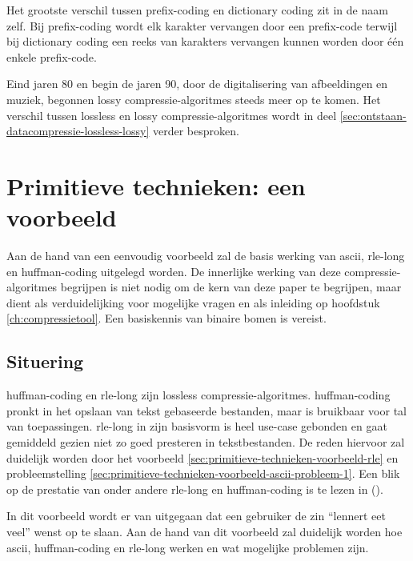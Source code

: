 Het grootste verschil tussen \gls{prefix-coding} en dictionary coding zit in de naam zelf. Bij \gls{prefix-coding} wordt elk karakter vervangen door een \gls{prefix-code} terwijl bij dictionary coding een reeks van karakters vervangen kunnen worden door één enkele \gls{prefix-code}.  

Eind jaren 80 en begin de jaren 90, door de digitalisering van afbeeldingen en muziek, begonnen \gls{lossy} \glspl{compressie-algoritme} steeds meer op te komen. Het verschil tussen \gls{lossless} en \gls{lossy} \glspl{compressie-algoritme} wordt in deel \ref{sec:ontstaan-datacompressie-lossless-lossy} verder besproken.


\section{Primitieve technieken: een voorbeeld}
\label{sec:primitieve-technieken-voorbeeld}
Aan de hand van een eenvoudig voorbeeld zal de basis werking van \gls{ascii}, \gls{rle-long} en \gls{huffman-coding} uitgelegd worden. De innerlijke werking van deze \glspl{compressie-algoritme} begrijpen is niet nodig om de kern van deze paper te begrijpen, maar dient als verduidelijking voor mogelijke vragen en als inleiding op hoofdstuk \ref{ch:compressietool}. Een basiskennis van binaire bomen is vereist.

\subsection{Situering}
\label{sec:primitieve-technieken-voorbeeld-situering}
\Gls{huffman-coding} en \gls{rle-long} zijn \gls{lossless} \glspl{compressie-algoritme}. \Gls{huffman-coding} pronkt in het opslaan van tekst gebaseerde bestanden, maar is bruikbaar voor tal van toepassingen. \Gls{rle-long} in zijn basisvorm is heel \gls{use-case} gebonden en gaat gemiddeld gezien niet zo goed presteren in tekstbestanden. De reden hiervoor zal duidelijk worden door het voorbeeld \ref{sec:primitieve-technieken-voorbeeld-rle} en probleemstelling \ref{sec:primitieve-technieken-voorbeeld-ascii-probleem-1}. Een blik op de prestatie van onder andere \gls{rle-long} en \gls{huffman-coding} is te lezen in  (\cite{losslessfortextdata}).

In dit voorbeeld wordt er van uitgegaan dat een gebruiker de zin “lennert eet veel” wenst op te slaan. Aan de hand van dit voorbeeld zal duidelijk worden hoe \gls{ascii}, \gls{huffman-coding} en \gls{rle-long} werken en wat mogelijke problemen zijn.

